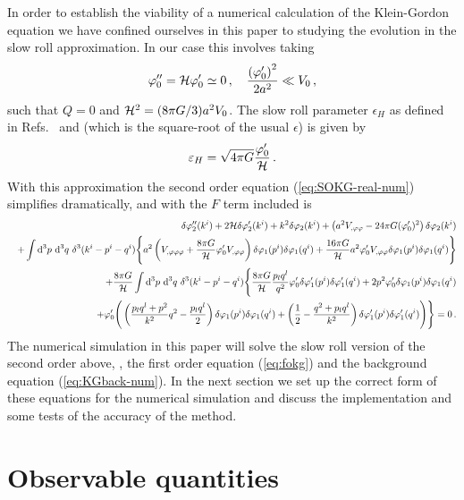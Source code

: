 In order to establish the viability of a numerical calculation of the
Klein-Gordon equation we have confined ourselves in this paper to studying the
evolution in the slow roll approximation. In our case this involves taking
%
\begin{equation}
 \varphi_{0}'' = \mathcal{H} \varphi_{0}' \simeq 0\,,\quad
\frac{\left(\varphi_{0}'\right)^2}{2a^2}\ll V_{0}\,,
\end{equation}
%
such that $Q=0$ and $\mathcal{H}^2 = (8\pi G/3) a^2 V_{0}$. The slow roll parameter
$\epsilon_H$ as defined in Refs.~\cite{Malik:2006ir} and \cite{Seery:2005gb} 
(which is the square-root of the usual $\epsilon$) is given by
%
\begin{equation}
 \varepsilon_H = \sqrt{4\pi G} \frac{\varphi_{0}'}{\mathcal{H}}\,.
\end{equation}
%
With this approximation the second order equation (\ref{eq:SOKG-real-num})
simplifies dramatically, and with the $F$ term included is
%
\begin{eqnarray}
 \label{eq:KG2-fourier-sr-num}
&&\dvp2''(\kvi)+2\H\dvp2'(\kvi)+k^2\dvp2(\kvi)
+\left(a^2
\Upp-{24 \pi G}(\vp_{0}')^2\right)
\dvp2(\kvi) \\
%
&&+\int \d^3p\ \d^3q\ \delta^3(\kvi-\pvi-\qvi) \Bigg\{
a^2\left(\Uppp
+ \frac{8\pi G}{\H}\vp_{0}' \Upp\right)
 \dvp1(\pvi)\dvp1(\qvi)
+\frac{16\pi G}{\H}a^2
\vp_{0}'\Upp\dvp1(\pvi)\dvp1(\qvi)\Bigg\}
\nonumber \\
%
&&+ \frac{8\pi G}{\H}
\int \d^3p\ \d^3q\ \delta^3(\kvi-\pvi-\qvi)  \Bigg\{
%
\frac{8\pi G}{\H}\frac{p_l q^l}{q^2}\vp_{0}'\dvp1'(\pvi)
\dvp1'(\qvi)
+2p^2\vp_{0}' \dvp1(\pvi) \dvp1(\qvi)\nonumber\\
%
&&\qquad\qquad\qquad\qquad
+\vp_{0}'
\Bigg(
\left(\frac{p_lq^l+p^2}{k^2}q^2-\frac{p_lq^l}{2}\right)
\dvp1(\pvi)\dvp1(\qvi)
+\left(\frac{1}{2}-\frac{q^2+p_lq^l}{k^2}\right)
\dvp1'(\pvi)\dvp1'(\qvi)\Bigg)
\Bigg\}=0 \,.\nonumber
\end{eqnarray}
%
The numerical simulation in this paper will solve the slow roll
version of the second order above, , the first
order equation (\ref{eq:fokg}) and the background equation
(\ref{eq:KGback-num}). In the next section we set up the correct form of
these equations for the numerical simulation and discuss the
implementation and some tests of the accuracy of the method.
% 
% 
% 
% 
\section{Observable quantities}
\label{sec:observable-perts}

